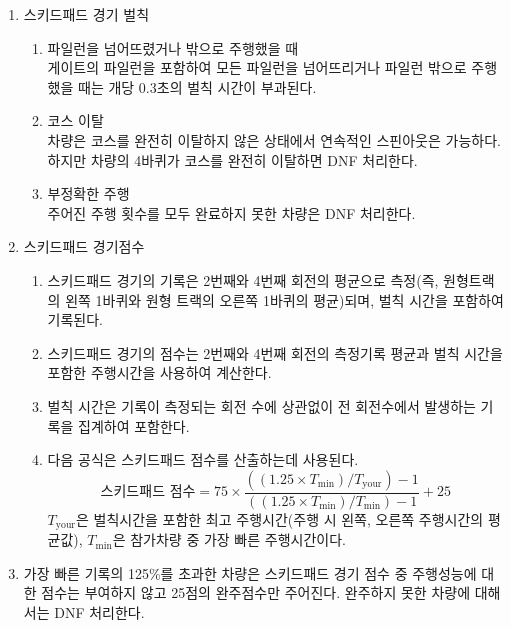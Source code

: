 \documentclass[final,a4paper,10pt]{report}
\begin{document}
\begin{enumerate}
\begin{enumerate}
      \item\label{rule:formula-competition.skid-pad.run-procedure.entry-direction-discretion} 조직위원회에서는 경기 현장 당시의 계측 장비 설치 위치 및 장비 보호 등의 사유로 우선 진입 트랙 방향을 임의로 결정할 수 있다.
    \end{enumerate}
  \item\label{rule:formula-competition.skid-pad.penalties} 스키드패드 경기 벌칙
    \begin{enumerate}
      \item\label{rule:formula-competition.skid-pad.penalties.downed-cone-penalty} 파일런을 넘어뜨렸거나 밖으로 주행했을 때\\
        게이트의 파일런을 포함하여 모든 파일런을 넘어뜨리거나 파일런 밖으로 주행했을 때는 개당 0.3초의 벌칙 시간이 부과된다.
      \item\label{rule:formula-competition.skid-pad.penalties.full-course-exit-dnf} 코스 이탈\\
        차량은 코스를 완전히 이탈하지 않은 상태에서 연속적인 스핀아웃은 가능하다. 하지만 차량의 4바퀴가 코스를 완전히 이탈하면 DNF 처리한다.
      \item\label{rule:formula-competition.skid-pad.penalties.incomplete-runs-dnf} 부정확한 주행\\
        주어진 주행 횟수를 모두 완료하지 못한 차량은 DNF 처리한다.
    \end{enumerate}
  \item\label{rule:formula-competition.skid-pad.scoring} 스키드패드 경기점수
    \begin{enumerate}
      \item\label{rule:formula-competition.skid-pad.scoring.avg-lap2-lap4-penalty} 스키드패드 경기의 기록은 2번째와 4번째 회전의 평균으로 측정(즉, 원형트랙의 왼쪽 1바퀴와 원형 트랙의 오른쪽 1바퀴의 평균)되며, 벌칙 시간을 포함하여 기록된다.
      \item\label{rule:formula-competition.skid-pad.scoring.score-from-avg-time} 스키드패드 경기의 점수는 2번째와 4번째 회전의 측정기록 평균과 벌칙 시간을 포함한 주행시간을 사용하여 계산한다.
      \item\label{rule:formula-competition.skid-pad.scoring.penalty-from-all-laps} 벌칙 시간은 기록이 측정되는 회전 수에 상관없이 전 회전수에서 발생하는 기록을 집계하여 포함한다.
      \item\label{rule:formula-competition.skid-pad.scoring.score-equation} 다음 공식은 스키드패드 점수를 산출하는데 사용된다.
        \[
          \text{스키드패드 점수} = 75 \times
          \frac{((1.25 \times T_{\min}) / T_{\mathrm{your}}) - 1}
               {((1.25 \times T_{\min}) / T_{\min}) - 1} + 25
        \]
        $T_{\mathrm{your}}$은 벌칙시간을 포함한 최고 주행시간(주행 시 왼쪽, 오른쪽 주행시간의 평균값), $T_{\min}$은 참가차량 중 가장 빠른 주행시간이다.
    \end{enumerate}
  \item\label{rule:formula-competition.skid-pad.over-125pct-finish-only} 가장 빠른 기록의 125\%를 초과한 차량은 스키드패드 경기 점수 중 주행성능에 대한 점수는 부여하지 않고 25점의 완주점수만 주어진다. 완주하지 못한 차량에 대해서는 DNF 처리한다.
\end{enumerate}
\end{document}
